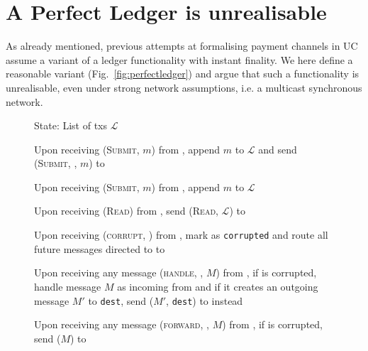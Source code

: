 \section{A Perfect Ledger is unrealisable}
\label{appendix:perfectledger}
  As already mentioned, previous attempts at formalising payment channels in
  UC~\cite{DBLP:conf/ccs/DziembowskiFH18,perun,Malavolta:2017:CPP:3133956.3134096,sprites}
  assume a variant of a ledger functionality with instant finality. We here
  define a reasonable variant \perfectledger{} (Fig.~\ref{fig:perfectledger})
  and argue that such a functionality is unrealisable, even under strong network
  assumptions, i.e. a multicast synchronous network.

  \begin{figure}[H]
    \begin{systembox}{\perfectledger}
      \begin{algorithmic}[1]
        \State State: List of txs $\mathcal{L}$
        \Statex

        \State Upon receiving (\textsc{Submit}, $m$) from \alice, append $m$ to
        $\mathcal{L}$ and send (\textsc{Submit}, \alice, $m$) to \adversary
        \Statex

        \State Upon receiving (\textsc{Submit}, $m$) from \adversary, append $m$
        to $\mathcal{L}$
        \Statex

        \State Upon receiving (\textsc{Read}) from \alice, send (\textsc{Read},
        $\mathcal{L}$) to \alice
        \Statex

        \State Upon receiving (\textsc{corrupt}, \alice) from \adversary, mark
        \alice{} as \texttt{corrupted} and route all future messages directed to
        \alice{} to \adversary
        \Statex

        \State Upon receiving any message (\textsc{handle}, \alice, $M$) from
        \adversary, if \alice{} is corrupted, handle message $M$ as incoming
        from \alice{} and if it creates an outgoing message $M'$ to
        \texttt{dest}, send ($M'$, \texttt{dest}) to \adversary{} instead
        \Statex

        \State Upon receiving any message (\textsc{forward}, \alice, $M$) from
        \adversary, if \alice{} is corrupted, send ($M$) to \alice
      \end{algorithmic}
    \end{systembox}
    \caption{}
    \label{fig:perfectledger:func}
  \end{figure}

